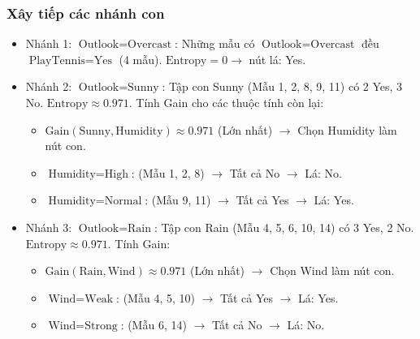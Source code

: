 \subsubsection*{Xây tiếp các nhánh con}
\begin{itemize}
    \item Nhánh 1: $\text{Outlook} = \text{Overcast}$: Những mẫu có $\text{Outlook} = \text{Overcast}$ đều $\text{PlayTennis} = \text{Yes}$ (4 mẫu). $\text{Entropy} = 0 \rightarrow$ nút lá: Yes.
    \item Nhánh 2: $\text{Outlook} = \text{Sunny}$: Tập con Sunny (Mẫu 1, 2, 8, 9, 11) có 2 Yes, 3 No. $\text{Entropy} \approx 0.971$. Tính Gain cho các thuộc tính còn lại:
    \begin{itemize}
        \item $\text{Gain}(\text{Sunny}, \text{Humidity}) \approx 0.971$ (Lớn nhất) $\rightarrow$ Chọn Humidity làm nút con.
        \item $\text{Humidity} = \text{High}$: (Mẫu 1, 2, 8) $\rightarrow$ Tất cả No $\rightarrow$ Lá: No.
        \item $\text{Humidity} = \text{Normal}$: (Mẫu 9, 11) $\rightarrow$ Tất cả Yes $\rightarrow$ Lá: Yes.
    \end{itemize}
    \item Nhánh 3: $\text{Outlook} = \text{Rain}$: Tập con Rain (Mẫu 4, 5, 6, 10, 14) có 3 Yes, 2 No. $\text{Entropy} \approx 0.971$. Tính Gain:
    \begin{itemize}
        \item $\text{Gain}(\text{Rain}, \text{Wind}) \approx 0.971$ (Lớn nhất) $\rightarrow$ Chọn Wind làm nút con.
        \item $\text{Wind} = \text{Weak}$: (Mẫu 4, 5, 10) $\rightarrow$ Tất cả Yes $\rightarrow$ Lá: Yes.
        \item $\text{Wind} = \text{Strong}$: (Mẫu 6, 14) $\rightarrow$ Tất cả No $\rightarrow$ Lá: No.
    \end{itemize}
\end{itemize}

